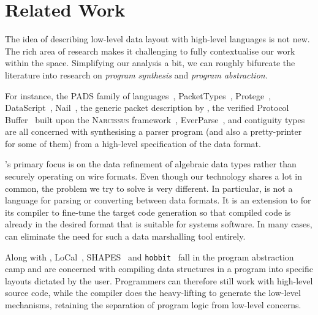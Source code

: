 \section{Related Work}\label{sec:rfw}

The idea of describing low-level data layout with high-level languages is
not new. The rich area of research makes it
challenging to fully contextualise our work within the
space. Simplifying our analysis a bit, we can roughly bifurcate the
literature into research on \emph{program synthesis} and \emph{program
abstraction}.

For instance, the PADS family of languages~\citep{FisherW11,
FisherG05, MandelbaumFWFG07}, PacketTypes~\citep{McCannC00},
Protege~\citep{WangG11}, DataScript~\citep{Back02}, Nail~\citep{Bangert_Zeldovich_14},
the generic
packet description by \citet{vanGeest_Swierstra_17}, the verified Protocol
Buffer~\citep{Ye_Delaware_19} built upon the \textsc{Narcissus}
framework~\citep{Delaware_SPYC_19}, EverParse~\citep{everparse},
and contiguity types~\citep{Slind_21} are all concerned
with synthesising a parser program (and also a pretty-printer for some of
them) from a high-level specification of the data format.

\dargent's primary focus is on the data refinement of algebraic
data types rather than securely operating on wire formats. Even though our
technology shares a lot in common, the problem we try to solve
is very different. In particular, \dargent is not a language for parsing or
converting between data formats. It is an extension to \cogent for its compiler to 
fine-tune the target code generation so that compiled code
is already in the desired format that is suitable for systems software.
In many cases, \dargent can eliminate the need for such a data marshalling tool entirely. 

Along with \dargent,
LoCal~\citep{Vollmer:2019}, SHAPES~\citep{Franco:17, Franco:19}
and \texttt{hobbit}~\citep{Diatchki_JL_05, Diatchki_Jones_06} fall in
 the program abstraction camp and 
are concerned with compiling
data structures in a program into specific layouts dictated by
the user. Programmers can therefore still work
with high-level source code, while the compiler 
does the heavy-lifting to generate the low-level mechanisms, retaining the 
separation of program logic from low-level concerns.

